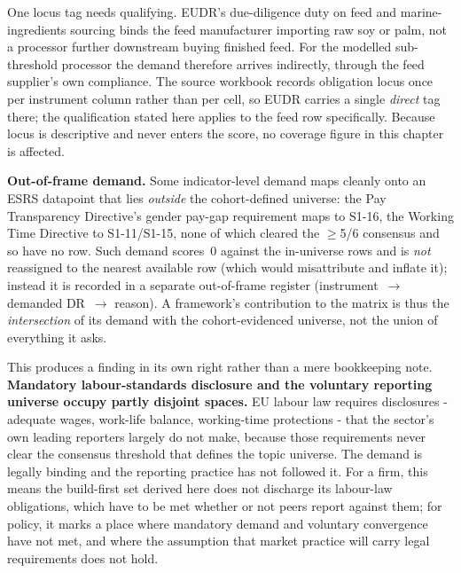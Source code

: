 One locus tag needs qualifying. EUDR's due-diligence duty on feed and
marine-ingredients sourcing binds the feed manufacturer importing raw soy or
palm, not a processor further downstream buying finished feed. For the modelled
sub-threshold processor the demand therefore arrives indirectly, through the feed
supplier's own compliance. The source workbook records obligation locus once per
instrument column rather than per cell, so EUDR carries a single \emph{direct}
tag there; the qualification stated here applies to the feed row specifically.
Because locus is descriptive and never enters the score, no coverage figure in
this chapter is affected.

\textbf{Out-of-frame demand.} Some indicator-level demand maps cleanly onto an
ESRS datapoint that lies \emph{outside} the cohort-defined universe: the Pay
Transparency Directive's gender pay-gap requirement maps to S1-16, the Working
Time Directive to S1-11/S1-15, none of which cleared the $\geq$5/6 consensus and
so have no row. Such demand scores~0 against the in-universe rows and is
\emph{not} reassigned to the nearest available row (which would misattribute and
inflate it); instead it is recorded in a separate out-of-frame register
(instrument~$\rightarrow$ demanded DR~$\rightarrow$ reason). A framework's
contribution to the matrix is thus the \emph{intersection} of its demand with the
cohort-evidenced universe, not the union of everything it asks.

This produces a finding in its own right rather than a mere bookkeeping note.
\textbf{Mandatory labour-standards disclosure and the voluntary reporting
universe occupy partly disjoint spaces.} EU labour law requires disclosures -
adequate wages, work-life balance, working-time protections - that the sector's
own leading reporters largely do not make, because those requirements never
clear the consensus threshold that defines the topic universe. The demand is
legally binding and the reporting practice has not followed it. For a firm, this
means the build-first set derived here does not discharge its labour-law
obligations, which have to be met whether or not peers report against them; for
policy, it marks a place where mandatory demand and voluntary convergence have
not met, and where the assumption that market practice will carry legal
requirements does not hold.

